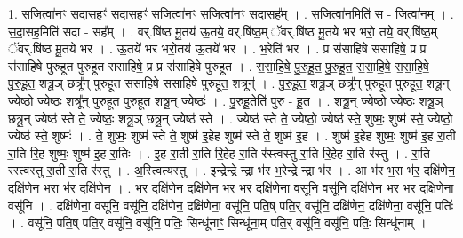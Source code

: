 \documentclass[17pt]{extarticle}
\begin{document}
1. स॒जित्वा॑नꣳ सदा॒सहꣳ॑ सदा॒सहꣳ॑ स॒जित्वा॑नꣳ स॒जित्वा॑नꣳ सदा॒सह᳚म् । . स॒जित्वा॑न॒मिति॑ स - जित्वा॑नम् । . स॒दा॒सह॒मिति॑ सदा - सह᳚म् । . वर्.षि॑ष्ठ मू॒तय॑ ऊ॒तये॒ वर्.षि॑ष्ठ॒म् ॅवर्.षि॑ष्ठ मू॒तये॑ भर भरो॒ तये॒ वर्.षि॑ष्ठ॒म् ॅवर्.षि॑ष्ठ मू॒तये॑ भर । . ऊ॒तये॑ भर भरो॒तय॑ ऊ॒तये॑ भर । . भ॒रेति॑ भर । . प्र स॑साहिषे ससाहिषे॒ प्र प्र स॑साहिषे पुरुहूत पुरुहूत ससाहिषे॒ प्र प्र स॑साहिषे पुरुहूत । . स॒सा॒हि॒षे॒ पु॒रु॒हू॒त॒ पु॒रु॒हू॒त॒ स॒सा॒हि॒षे॒ स॒सा॒हि॒षे॒ पु॒रु॒हू॒त॒ शत्रू॒ञ् छत्रू᳚न् पुरुहूत ससाहिषे ससाहिषे पुरुहूत॒ शत्रून्॑ । . पु॒रु॒हू॒त॒ शत्रू॒ञ् छत्रू᳚न् पुरुहूत पुरुहूत॒ शत्रू॒न् ज्येष्ठो॒ ज्येष्ठः॒ शत्रू᳚न् पुरुहूत पुरुहूत॒ शत्रू॒न् ज्येष्ठः॑ । . पु॒रु॒हू॒तेति॑ पुरु - हू॒त॒ । . शत्रू॒न् ज्येष्ठो॒ ज्येष्ठः॒ शत्रू॒ञ् छत्रू॒न् ज्येष्ठ॑ स्ते ते॒ ज्येष्ठः॒ शत्रू॒ञ् छत्रू॒न् ज्येष्ठ॑ स्ते । . ज्येष्ठ॑ स्ते ते॒ ज्येष्ठो॒ ज्येष्ठ॑ स्ते॒ शुष्मः॒ शुष्म॑ स्ते॒ ज्येष्ठो॒ ज्येष्ठ॑ स्ते॒ शुष्मः॑ । . ते॒ शुष्मः॒ शुष्म॑ स्ते ते॒ शुष्म॑ इ॒हेह शुष्म॑ स्ते ते॒ शुष्म॑ इ॒ह । . शुष्म॑ इ॒हेह शुष्मः॒ शुष्म॑ इ॒ह रा॒ती रा॒ति रि॒ह शुष्मः॒ शुष्म॑ इ॒ह रा॒तिः । . इ॒ह रा॒ती रा॒ति रि॒हेह रा॒ति र॑स्त्वस्तु रा॒ति रि॒हेह रा॒ति र॑स्तु । . रा॒ति र॑स्त्वस्तु रा॒ती रा॒ति र॑स्तु । . अ॒स्त्वित्य॑स्तु । . इन्द्रेन्द्रे न्द्रा भ॑र भ॒रेन्द्रे न्द्रा भ॑र । . आ भ॑र भ॒रा भ॑र॒ दक्षि॑णेन॒ दक्षि॑णेन भ॒रा भ॑र॒ दक्षि॑णेन । . भ॒र॒ दक्षि॑णेन॒ दक्षि॑णेन भर भर॒ दक्षि॑णेना॒ वसू॑नि॒ वसू॑नि॒ दक्षि॑णेन भर भर॒ दक्षि॑णेना॒ वसू॑नि । . दक्षि॑णेना॒ वसू॑नि॒ वसू॑नि॒ दक्षि॑णेन॒ दक्षि॑णेना॒ वसू॑नि॒ पति॒ष् पति॒र् वसू॑नि॒ दक्षि॑णेन॒ दक्षि॑णेना॒ वसू॑नि॒ पतिः॑ । . वसू॑नि॒ पति॒ष् पति॒र् वसू॑नि॒ वसू॑नि॒ पतिः॒ सिन्धू॑नाꣳ॒॒ सिन्धू॑ना॒म् पति॒र् वसू॑नि॒ वसू॑नि॒ पतिः॒ सिन्धू॑नाम् । \newline
\end{document}
